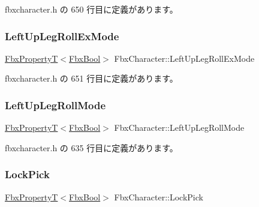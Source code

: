 fbxcharacter.\+h の 650 行目に定義があります。

\mbox{\label{class_fbx_character_a4e769bc27457b215a8c2290bb3800b01}} 
\subsubsection{\texorpdfstring{Left\+Up\+Leg\+Roll\+Ex\+Mode}{LeftUpLegRollExMode}}
{\footnotesize\ttfamily \hyperlink{class_fbx_property_t}{Fbx\+PropertyT}$<$\hyperlink{fbxtypes_8h_a92e0562b2fe33e76a242f498b362262e}{Fbx\+Bool}$>$ Fbx\+Character\+::\+Left\+Up\+Leg\+Roll\+Ex\+Mode}



 fbxcharacter.\+h の 651 行目に定義があります。

\mbox{\label{class_fbx_character_a84a8c860549c7a6ae3f2c38535286501}} 
\subsubsection{\texorpdfstring{Left\+Up\+Leg\+Roll\+Mode}{LeftUpLegRollMode}}
{\footnotesize\ttfamily \hyperlink{class_fbx_property_t}{Fbx\+PropertyT}$<$\hyperlink{fbxtypes_8h_a92e0562b2fe33e76a242f498b362262e}{Fbx\+Bool}$>$ Fbx\+Character\+::\+Left\+Up\+Leg\+Roll\+Mode}



 fbxcharacter.\+h の 635 行目に定義があります。

\mbox{\label{class_fbx_character_aebb6c968bc52b7fa922f7b16b7161ac6}} 
\subsubsection{\texorpdfstring{Lock\+Pick}{LockPick}}
{\footnotesize\ttfamily \hyperlink{class_fbx_property_t}{Fbx\+PropertyT}$<$\hyperlink{fbxtypes_8h_a92e0562b2fe33e76a242f498b362262e}{Fbx\+Bool}$>$ Fbx\+Character\+::\+Lock\+Pick}




